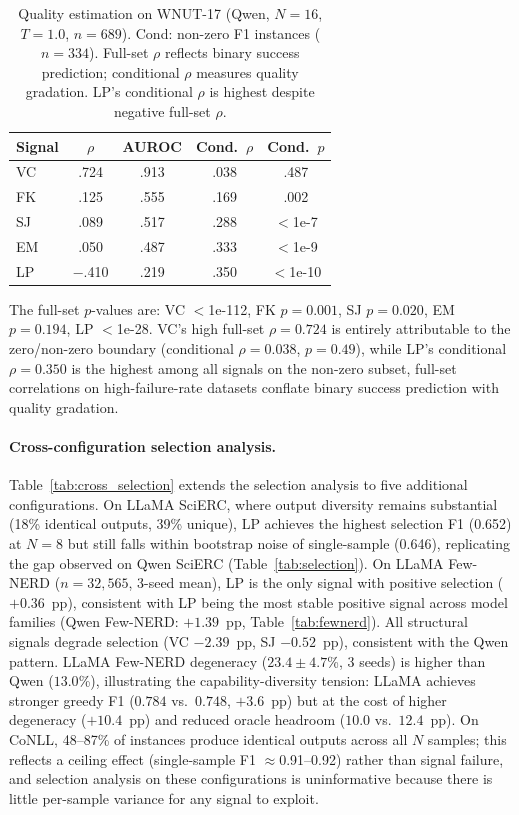 \begin{table}[t]
\centering
\small
\caption{Quality estimation on WNUT-17 (Qwen, $N{=}16$, $T{=}1.0$, $n{=}689$). Cond: non-zero F1 instances ($n{=}334$). Full-set $\rho$ reflects binary success prediction; conditional $\rho$ measures quality gradation. LP's conditional $\rho$ is highest despite negative full-set $\rho$.}
\label{tab:wnut}
\begin{tabular}{lcccc}
\toprule
Signal & $\rho$ & AUROC & Cond.\ $\rho$ & Cond.\ $p$ \\
\midrule
VC      & .724 & .913 & .038 & .487 \\
FK      & .125 & .555 & .169 & .002 \\
SJ      & .089 & .517 & .288 & ${<}$1e-7 \\
EM      & .050 & .487 & .333 & ${<}$1e-9 \\
LP & $-$.410 & .219 & .350 & ${<}$1e-10 \\
\bottomrule
\end{tabular}
\end{table}
The full-set $p$-values are: VC ${<}$1e-112, FK $p{=}0.001$, SJ $p{=}0.020$, EM $p{=}0.194$, LP ${<}$1e-28.
VC's high full-set $\rho{=}0.724$ is entirely attributable to the zero/non-zero boundary (conditional $\rho{=}0.038$, $p{=}0.49$), while LP's conditional $\rho{=}0.350$ is the highest among all signals on the non-zero subset, full-set correlations on high-failure-rate datasets conflate binary success prediction with quality gradation.

\paragraph{Cross-configuration selection analysis.}
Table~\ref{tab:cross_selection} extends the selection analysis to five additional configurations.
On LLaMA SciERC, where output diversity remains substantial (18\% identical outputs, 39\% unique), LP achieves the highest selection F1 (0.652) at $N{=}8$ but still falls within bootstrap noise of single-sample (0.646), replicating the gap observed on Qwen SciERC (Table~\ref{tab:selection}).
On LLaMA Few-NERD ($n{=}32{,}565$, 3-seed mean), LP is the only signal with positive selection ($+0.36$~pp), consistent with LP being the most stable positive signal across model families (Qwen Few-NERD: $+1.39$~pp, Table~\ref{tab:fewnerd}). All structural signals degrade selection (VC $-2.39$~pp, SJ $-0.52$~pp), consistent with the Qwen pattern. LLaMA Few-NERD degeneracy ($23.4{\pm}4.7$\%, 3 seeds) is higher than Qwen ($13.0$\%), illustrating the capability-diversity tension: LLaMA achieves stronger greedy F1 ($0.784$ vs.\ $0.748$, $+3.6$~pp) but at the cost of higher degeneracy ($+10.4$~pp) and reduced oracle headroom ($10.0$ vs.\ $12.4$~pp).
On CoNLL, 48--87\% of instances produce identical outputs across all $N$ samples; this reflects a ceiling effect (single-sample F1 ${\approx}$0.91--0.92) rather than signal failure, and selection analysis on these configurations is uninformative because there is little per-sample variance for any signal to exploit.

